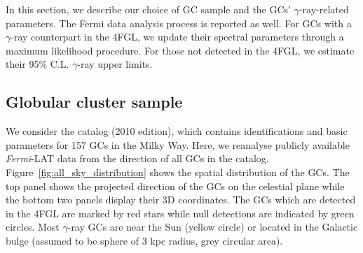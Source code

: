 \documentclass[doublespace,draft,nopageskip]{VTthesis} %
\begin{document}
In this section, we describe our choice of GC sample and the GCs' $\gamma$-ray-related parameters. The Fermi data analysis process is reported as well. For GCs with a $\gamma$-ray counterpart in the 4FGL, we update their spectral parameters through a maximum likelihood procedure. For those not detected in the 4FGL, we estimate their 95\% C.L. $\gamma$-ray upper limits.

\subsection{Globular cluster sample}\label{sec:samples}

We consider the \citet{1996AJ....112.1487H} catalog (2010 edition), which contains identifications and basic parameters for 157 GCs in the Milky Way. Here, we reanalyse publicly available {\it Fermi}-LAT data from the direction of all GCs in the \citet{1996AJ....112.1487H} catalog. Figure~\ref{fig:all_sky_distribution} shows the spatial distribution of the GCs. The top panel shows the projected direction of the GCs on the celestial plane while the bottom two panels display their 3D coordinates. The GCs which are detected in the 4FGL are marked by red stars while null detections are indicated by green circles. Most $\gamma$-ray GCs are near the Sun (yellow circle) or located in the Galactic bulge (assumed to be sphere of 3 kpc radius, grey circular area).
\end{document}
